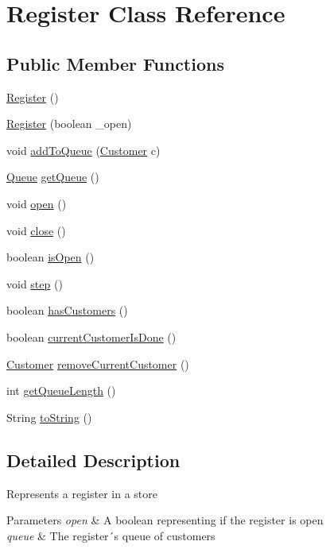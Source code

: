 \hypertarget{class_register}{}\section{Register Class Reference}
\label{class_register}
\subsection*{Public Member Functions}
\begin{DoxyCompactItemize}
\item 
\hyperlink{class_register_af15631d2edc3c9b87166f923b3d3a00f}{Register} ()
\item 
\hyperlink{class_register_a938cbf78ca6f8b7d738a2e6aa4b2ba42}{Register} (boolean \+\_\+open)
\item 
void \hyperlink{class_register_a9ed3f3799b5ea459d6df53f82b54e69f}{add\+To\+Queue} (\hyperlink{class_customer}{Customer} c)
\item 
\hyperlink{class_queue}{Queue} \hyperlink{class_register_a6f712d705f87c1a1d0bb9acd054bb453}{get\+Queue} ()
\item 
void \hyperlink{class_register_ac02a67e31b492873afbbc5ce2840d7fb}{open} ()
\item 
void \hyperlink{class_register_a6ff4bf08b8934138ae25ebdbdaa9a968}{close} ()
\item 
boolean \hyperlink{class_register_a892ac0d31549027d495948c82ff3ae7a}{is\+Open} ()
\item 
void \hyperlink{class_register_a71c5705fbba0bf88661cf3e7dd3b10d1}{step} ()
\item 
boolean \hyperlink{class_register_ae7c8276901821f6e866472afa54441a7}{has\+Customers} ()
\item 
boolean \hyperlink{class_register_a5feae9eebb986ff4798ba79a5b1f0c0a}{current\+Customer\+Is\+Done} ()
\item 
\hyperlink{class_customer}{Customer} \hyperlink{class_register_a09213fdfd15a583e5c6fe0bbe8505da3}{remove\+Current\+Customer} ()
\item 
int \hyperlink{class_register_a447023dcde7ef511a8222805114017e5}{get\+Queue\+Length} ()
\item 
String \hyperlink{class_register_ab27bc35d9b9514d42378b23193bf5dee}{to\+String} ()
\end{DoxyCompactItemize}


\subsection{Detailed Description}
Represents a register in a store 
\begin{DoxyParams}{Parameters}
{\em open} & A boolean representing if the register is open \\
\hline
{\em queue} & The register´s queue of customers \\
\hline
\end{DoxyParams}


